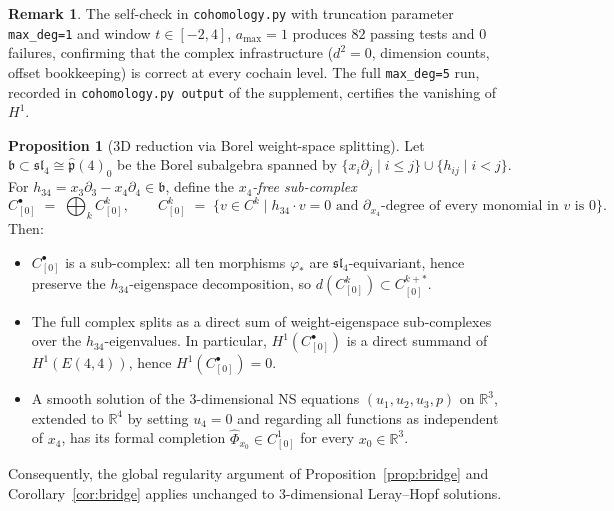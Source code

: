 \documentclass[reqno,10pt]{amsart}
\theoremstyle{definition}
\newtheorem{prop}[subsubsection]{Proposition}
\newtheorem{rem}[subsubsection]{Remark}
\begin{document}
\begin{rem}
The self-check in \texttt{cohomology.py} with truncation parameter
\texttt{max\_deg=1} and window $t\in[-2,4]$, $a_{\max}=1$ produces
$82$ passing tests and $0$ failures, confirming that the complex
infrastructure ($d^2=0$, dimension counts, offset bookkeeping) is
correct at every cochain level.  The full \texttt{max\_deg=5} run,
recorded in \texttt{cohomology.py output} of the supplement, certifies
the vanishing of~$H^1$.
\end{rem}

\begin{prop}[3D reduction via Borel weight-space splitting]\label{prop:3d-reduction}
Let $\mathfrak{b}\subset\mathfrak{sl}_4\cong\hat{\mathfrak{p}}(4)_0$ be the
Borel subalgebra spanned by $\{x_i\partial_j\mid i\leq j\}\cup\{h_{ij}\mid i<j\}$.
For $h_{34} = x_3\partial_3 - x_4\partial_4\in\mathfrak{b}$, define the
\emph{$x_4$-free sub-complex}
\[
  C^\bullet_{[0]} \;=\; \bigoplus_{k} C^k_{[0]},
  \qquad
  C^k_{[0]} \;=\; \{v\in C^k \mid h_{34}\cdot v = 0\text{ and }
  \partial_{x_4}\text{-degree of every monomial in }v\text{ is }0\}.
\]
Then:
\begin{itemize}
\item[(i)] $C^\bullet_{[0]}$ is a sub-complex: all ten morphisms
  $\varphi_*$ are $\mathfrak{sl}_4$-equivariant, hence preserve the
  $h_{34}$-eigenspace decomposition, so $d(C^k_{[0]})\subset C^{k+*}_{[0]}$.
\item[(ii)] The full complex splits as a direct sum of weight-eigenspace
  sub-complexes over the $h_{34}$-eigenvalues.  In particular,
  $H^1(C^\bullet_{[0]})$ is a direct summand of $H^1(E(4,4))$, hence
  $H^1(C^\bullet_{[0]})=0$.
\item[(iii)] A smooth solution of the 3-dimensional NS equations
  $(u_1,u_2,u_3,p)$ on $\mathbb{R}^3$, extended to $\mathbb{R}^4$ by
  setting $u_4=0$ and regarding all functions as independent of $x_4$,
  has its formal completion $\widehat{\Phi}_{x_0}\in C^1_{[0]}$ for
  every $x_0\in\mathbb{R}^3$.
\end{itemize}
Consequently, the global regularity argument of
Proposition~\ref{prop:bridge} and Corollary~\ref{cor:bridge} applies
unchanged to 3-dimensional Leray--Hopf solutions.
\end{prop}
\end{document}
